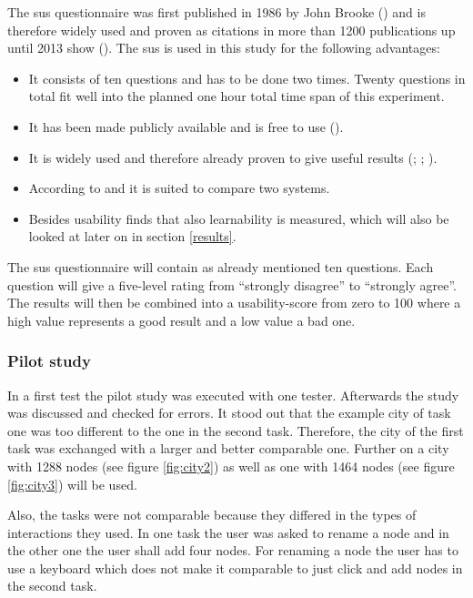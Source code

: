 The \gls{sus} questionnaire was first published in 1986 by John Brooke (\cite{brooke1996sus}) and is therefore widely used and proven as citations in more than 1200 publications up until 2013 show (\cite{brooke2013}).
The \gls{sus} is used in this study for the following advantages: 
\begin{itemize}
  \item It consists of ten questions and has to be done two times. Twenty questions in total fit well into the planned one hour total time span of this experiment.
  \item It has been made publicly available and is free to use (\cite{brooke1996sus}).
  \item It is widely used and therefore already proven to give useful results (\cite{brooke2013}; \cite{lewis2018system}; \cite{grier2013system}).
  \item According to \cite{doi:10.1177/1541931213571043} and \cite{doi:10.1080/10447310802205776} it is suited to compare two systems.
  \item Besides \gls{usability} \cite{10.1007/978-3-642-02806-9_12} finds that also learnability is measured, which will also be looked at later on in section \ref{results}.
\end{itemize}
The \gls{sus} questionnaire will contain as already mentioned ten questions.
Each question will give a five-level rating from \enquote{strongly disagree} to \enquote{strongly agree}.
The results will then be combined into a \gls{usability}-score from zero to 100 where a high value represents a good result and a low value a bad one.
\subsubsection{Pilot study}
\label{pilot}
In a first test the pilot study was executed with one tester.
Afterwards the study was discussed and checked for errors.
It stood out that the example \gls{city} of task one was too different to the one in the second task.
Therefore, the \gls{city} of the first task was exchanged with a larger and better comparable one.
Further on a \gls{city} with 1288 nodes (see figure \ref{fig:city2}) as well as one with 1464 nodes (see figure \ref{fig:city3}) will be used.

Also, the tasks were not comparable because they differed in the types of interactions they used.
In one task the user was asked to rename a node and in the other one the user shall add four nodes.
For renaming a node the user has to use a keyboard which does not make it comparable to just click and add nodes in the second task.

